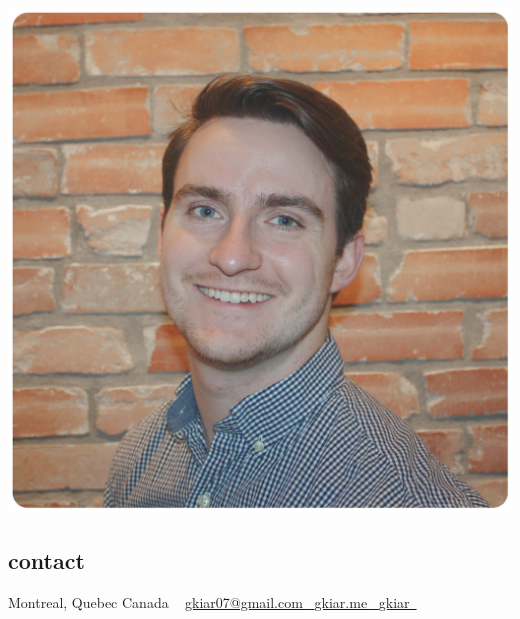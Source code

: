 \documentclass[]{friggeri-cv} %
\begin{document}


\begin{aside} %
\includegraphics[width=\textwidth]{./headshot_shorthair.png}
\subsection{contact}
Montreal, Quebec
Canada
~
\href{mailto:gkiar07@gmail.com}{gkiar07@gmail.com~{\color{red} \faEnvelope}}
\href{http://gkiar.github.io}{gkiar.me~{\color{lightblue} \faGlobe}}
\href{http://github.com/gkiar}{gkiar~{\color{purple} \faGithub}}
\href{https://twitter.com/g_kiar}{{\color{blue} \faTwitter}} \href{https://www.linkedin.com/in/gregkiar}{{\color{green} \faLinkedin}} \href{https://publons.com/author/1305375/gregory-kiar#profile}{{\color{plubblue} \aiPublons}} \href{http://orcid.org/0000-0001-8915-496X}{{\color{orcidgreen} \aiOrcid}} \href{https://scholar.google.com/citations?user=ztw6g7kAAAAJ&hl=en}{{\color{googred} \aiGoogleScholar}}

\end{aside}
\end{document}

